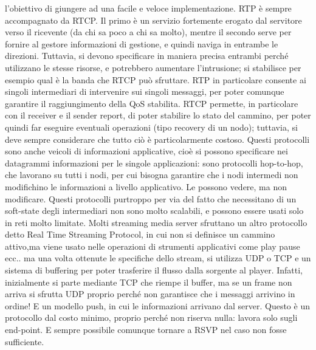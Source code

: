 l'obiettivo di giungere ad una facile e veloce implementazione.
RTP è sempre accompagnato da RTCP. Il primo è un servizio fortemente erogato dal
servitore verso il ricevente (da chi
sa poco a chi sa molto), mentre il secondo serve per fornire al gestore
informazioni di gestione, e quindi naviga
in entrambe le direzioni. Tuttavia, si devono specificare in maniera precisa
entrambi perché utilizzano le stesse
risorse, e potrebbero aumentare l'intrusione; si stabilisce per esempio qual è
la banda che RTCP può sfruttare.
RTP in particolare consente ai singoli intermediari di intervenire sui singoli
messaggi, per poter comunque garantire
il raggiungimento della QoS stabilita. RTCP permette, in particolare con il
receiver e il sender report, di poter
stabilire lo stato del cammino, per poter quindi far eseguire eventuali
operazioni (tipo recovery di un nodo);
tuttavia, si deve sempre considerare che tutto ciò è particolarmente costoso.
Questi protocolli sono anche veicoli di informazioni applicative, cioè si
possono specificare nei datagrammi
informazioni per le singole applicazioni: sono protocolli hop-to-hop, che
lavorano su tutti i nodi, per cui bisogna
garantire che i nodi intermedi non modifichino le informazioni a livello
applicativo. Le possono vedere, ma non
modificare.
Questi protocolli purtroppo per via del fatto che necessitano di un soft-state
degli intermediari non sono molto scalabili, e possono essere usati solo in reti
molto limitate. Molti streaming media server sfruttano un altro protocollo detto
Real Time Streaming Protocol, in cui non si definisce un cammino attivo,ma viene
usato nelle operazioni di strumenti applicativi come play pause ecc.. ma una
volta ottenute le specifiche dello stream, si utilizza UDP o TCP e un sistema di
buffering per poter trasferire il flusso dalla sorgente al player. Infatti,
inizialmente si parte mediante TCP che riempe il buffer, ma se un frame non
arriva si sfrutta UDP proprio perché non garantisce che i messaggi arrivino in
ordine! E un modello push, in cui le informazioni arrivano dal server. Questo è
un protocollo dal costo minimo, proprio perché non riserva nulla: lavora solo
sugli end-point. E sempre possibile comunque tornare a RSVP nel caso non fosse
sufficiente.
